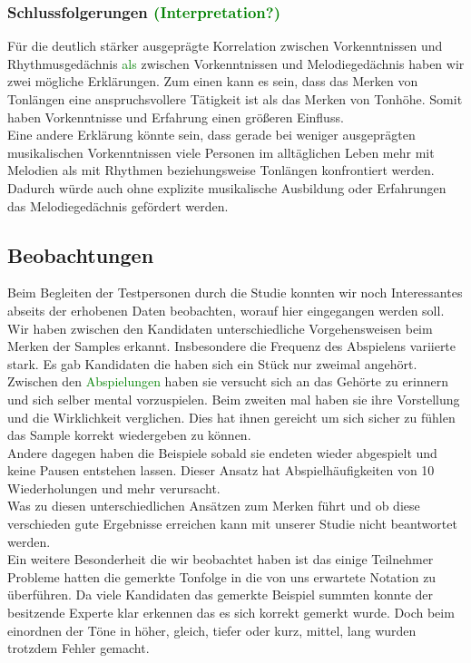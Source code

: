 \documentclass{acm_proc_article-sp}
\begin{document}
\subsubsection{Schlussfolgerungen \textcolor{green}{(Interpretation?)}}
Für die deutlich stärker ausgeprägte Korrelation zwischen Vorkenntnissen und Rhythmusgedächnis \textcolor{green}{als} zwischen Vorkenntnissen und Melodiegedächnis haben wir zwei mögliche Erklärungen. Zum einen kann es sein, dass das Merken von Tonlängen eine anspruchsvollere Tätigkeit ist als das Merken von Tonhöhe. Somit haben Vorkenntnisse und Erfahrung einen größeren Einfluss. \\
Eine andere Erklärung könnte sein, dass gerade bei weniger ausgeprägten musikalischen Vorkenntnissen viele Personen im alltäglichen Leben mehr mit Melodien als mit Rhythmen beziehungsweise Tonlängen konfrontiert werden. Dadurch würde auch ohne explizite musikalische Ausbildung oder Erfahrungen das Melodiegedächnis gefördert werden.\\
\subsection{Beobachtungen}
Beim Begleiten der Testpersonen durch die Studie konnten wir noch Interessantes abseits der erhobenen Daten beobachten, worauf hier eingegangen werden soll.\\

Wir haben zwischen den Kandidaten unterschiedliche Vorgehensweisen beim Merken der Samples erkannt. Insbesondere die Frequenz des Abspielens variierte stark. Es gab Kandidaten die haben sich ein Stück nur zweimal angehört. Zwischen den \textcolor{green}{Abspielungen} haben sie versucht sich an das Gehörte zu erinnern und sich selber mental vorzuspielen. Beim zweiten mal haben sie ihre Vorstellung und die Wirklichkeit verglichen. Dies hat ihnen gereicht um sich sicher zu fühlen das Sample korrekt wiedergeben zu können.\\
Andere dagegen haben die Beispiele sobald sie endeten wieder abgespielt und keine Pausen entstehen lassen. Dieser Ansatz hat Abspielhäufigkeiten von 10 Wiederholungen und mehr verursacht.\\ 
Was zu diesen unterschiedlichen Ansätzen zum Merken führt und ob diese verschieden gute Ergebnisse erreichen kann mit unserer Studie nicht beantwortet werden.\\

Ein weitere Besonderheit die wir beobachtet haben ist das einige Teilnehmer Probleme hatten die gemerkte Tonfolge in die von uns erwartete Notation zu überführen. Da viele Kandidaten das gemerkte Beispiel summten konnte der besitzende Experte klar erkennen das es sich korrekt gemerkt wurde. Doch beim einordnen der Töne in höher, gleich, tiefer oder kurz, mittel, lang wurden trotzdem Fehler gemacht.
\end{document}
